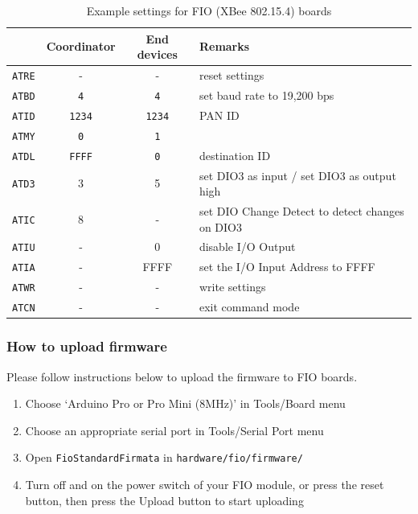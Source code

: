 \documentclass[9pt]{jsarticle}
\begin{document}
\begin{table}[htdp]
\begin{center}
\small
\begin{tabular}{|r|c|c|l|}
\hline   & Coordinator & End devices & Remarks \\\hline
\hline \texttt{ATRE} & - & - & reset settings \\
\hline \texttt{ATBD} & \texttt{4} & \texttt{4} & set baud rate to 19,200 bps \\
\hline \texttt{ATID} & \texttt{1234} & \texttt{1234} & PAN ID \\
\hline \texttt{ATMY} & \texttt{0} & \texttt{1} &  \\
\hline \texttt{ATDL} & \texttt{FFFF} & \texttt{0} & destination ID \\
\hline \texttt{ATD3} & 3 & 5 & set DIO3 as input / set DIO3 as output high \\
\hline \texttt{ATIC} & 8 & - & set DIO Change Detect to detect changes on DIO3 \\
\hline \texttt{ATIU} & - & 0 & disable I/O Output \\
\hline \texttt{ATIA} & - & FFFF & set the I/O Input Address to FFFF \\
\hline \texttt{ATWR} & - & - & write settings \\
\hline \texttt{ATCN} & - & - & exit command mode \\
\hline 
\end{tabular} 
\caption{Example settings for FIO (XBee 802.15.4) boards}
\end{center}
\label{xbee}
\end{table}

\newpage
\subsubsection{How to upload firmware}
\label{uploading_firmata_fio}
Please follow instructions below to upload the firmware to FIO boards.
\begin{enumerate}
\item Choose `Arduino Pro or Pro Mini (8MHz)' in Tools/Board menu
\item Choose an appropriate serial port in Tools/Serial Port menu
\item Open \texttt{FioStandardFirmata} in \texttt{hardware/fio/firmware/}
\item Turn off and on the power switch of your FIO module, or press the reset button, then press the Upload button to start uploading
\end{enumerate}
\end{document}
